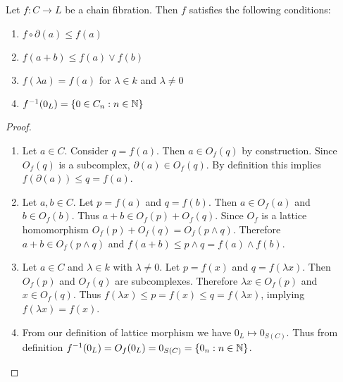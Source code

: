 \begin{prop}\label{prop:cf}
Let $f:C\to L$ be a chain fibration.  Then $f$ satisfies the following conditions:
\begin{enumerate}
\item $f\circ \partial(a) \leq f(a)$

\item $f(a+ b) \leq f(a)\vee f(b)$

\item $f(\lambda a) = f(a)$ for $\lambda\in k$ and $\lambda \neq 0$ 

\item $f^{-1}(0_L) = \{0 \in C_n: n\in {\mathbb{N}}\}$

\end{enumerate}
\end{prop}
\begin{proof}
\begin{enumerate}
\item Let $a\in C$.  Consider $q=f(a)$.  Then $a\in O_f(q)$ by construction.  Since $O_f(q)$ is a subcomplex, $\partial(a)\in O_f(q)$.  By definition this implies $f(\partial (a)) \leq q=f(a)$.

\item Let $a,b\in C$.  Let $p=f(a)$ and $q=f(b)$.  Then $a\in O_f(a)$ and $b\in O_f(b)$.  Thus $a+b\in O_f(p)+O_f(q)$.  Since $O_f$ is a lattice homomorphism $O_f(p)+O_f(q)= O_f(p\wedge q)$.  Therefore $a+b\in O_f(p\wedge q)$ and $f(a+b)\leq p\wedge q = f(a)\wedge f(b)$.

\item Let $a\in C$ and $\lambda\in k$ with $\lambda \neq 0$.  Let $p=f(x)$ and $q=f(\lambda x)$.  Then $O_f(p)$ and $O_f(q)$ are subcomplexes.  Therefore $\lambda x\in O_f(p)$ and $x\in O_f(q)$.  Thus $f(\lambda x) \leq p = f(x) \leq q = f(\lambda x)$, implying $f(\lambda x ) = f(x)$.

\item From our definition of lattice morphism we have $0_L\mapsto 0_{S(C)}$.  Thus from definition $f^{-1}(0_L) = O_f(0_L) = 0_{S(C)} = \{0_n:n\in {\mathbb{N}}\}$.

\end{enumerate}
\end{proof}
%
%
%
%
%
